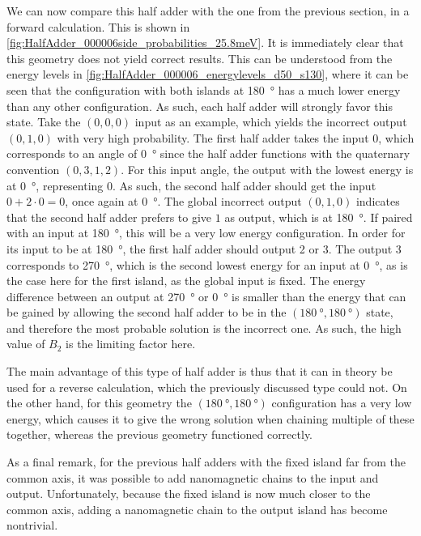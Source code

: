 \documentclass[11pt,a4paper,english,twoside]{article}
\begin{document}
We can now compare this half adder with the one from the previous section, in a forward calculation. This is shown in \cref{fig:HalfAdder_000006side_probabilities_25.8meV}. It is immediately clear that this geometry does not yield correct results. This can be understood from the energy levels in \cref{fig:HalfAdder_000006_energylevels_d50_s130}, where it can be seen that the configuration with both islands at \SI{180}{\degree} has a much lower energy than any other configuration. As such, each half adder will strongly favor this state. Take the $(0,0,0)$ input as an example, which yields the incorrect output $(0,1,0)$ with very high probability. The first half adder takes the input 0, which corresponds to an angle of \SI{0}{\degree} since the half adder functions with the quaternary convention $(0,3,1,2)$. For this input angle, the output with the lowest energy is at \SI{0}{\degree}, representing 0. As such, the second half adder should get the input $0+2\cdot0=0$, once again at \SI{0}{\degree}. The global incorrect output $(0,1,0)$ indicates that the second half adder prefers to give $1$ as output, which is at \SI{180}{\degree}. If paired with an input at \SI{180}{\degree}, this will be a very low energy configuration. In order for its input to be at \SI{180}{\degree}, the first half adder should output 2 or 3. The output 3 corresponds to \SI{270}{\degree}, which is the second lowest energy for an input at \SI{0}{\degree}, as is the case here for the first island, as the global input is fixed. The energy difference between an output at \SI{270}{\degree} or \SI{0}{\degree} is smaller than the energy that can be gained by allowing the second half adder to be in the $(\SI{180}{\degree}, \SI{180}{\degree})$ state, and therefore the most probable solution is the incorrect one. As such, the high value of $B_2$ is the limiting factor here. \par
The main advantage of this type of half adder is thus that it can in theory be used for a reverse calculation, which the previously discussed type could not. On the other hand, for this geometry the $(\SI{180}{\degree}, \SI{180}{\degree})$ configuration has a very low energy, which causes it to give the wrong solution when chaining multiple of these together, whereas the previous geometry functioned correctly. \par
As a final remark, for the previous half adders with the fixed island far from the common axis, it was possible to add nanomagnetic chains to the input and output. Unfortunately, because the fixed island is now much closer to the common axis, adding a nanomagnetic chain to the output island has become nontrivial.
\end{document}

